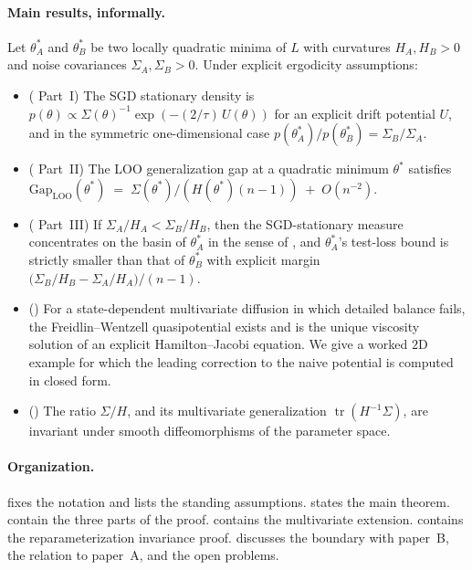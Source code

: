 \documentclass[11pt,a4paper]{article}
\theoremstyle{definition}
\theoremstyle{remark}
\DeclareMathOperator{\tr}{tr}
\newcommand{\Gap}{\mathrm{Gap}}
\newcommand{\LOO}{\mathrm{LOO}}
\begin{document}
\paragraph{Main results, informally.}
Let $\theta_A^*$ and $\theta_B^*$ be two locally quadratic minima of $L$
with curvatures $H_A,H_B>0$ and noise covariances $\Sigma_A,\Sigma_B>0$.
Under explicit ergodicity assumptions:
\begin{itemize}
\item ( Part~I) The SGD stationary density is
   $p(\theta) \propto \Sigma(\theta)^{-1}\exp(-(2/\tau)\,U(\theta))$
   for an explicit drift potential $U$, and in the symmetric one-dimensional
   case $p(\theta_A^*)/p(\theta_B^*) = \Sigma_B/\Sigma_A$.
\item ( Part~II) The LOO generalization gap at a
   quadratic minimum $\theta^*$ satisfies
   $\Gap_{\LOO}(\theta^*) \;=\; \Sigma(\theta^*)/(H(\theta^*)(n-1)) \;+\;
                                                                  O(n^{-2})$.
\item ( Part~III) If $\Sigma_A/H_A < \Sigma_B/H_B$,
   then the SGD-stationary measure concentrates on the basin of $\theta_A^*$
   in the sense of , and $\theta_A^*$'s test-loss
   bound is strictly smaller than that of $\theta_B^*$ with explicit margin
   $\bigl(\Sigma_B/H_B - \Sigma_A/H_A\bigr)/(n-1)$.
\item () For a state-dependent multivariate diffusion in
   which detailed balance fails, the Freidlin--Wentzell quasipotential
   exists and is the unique viscosity solution of an explicit
   Hamilton--Jacobi equation.  We give a worked $2$D example for which
   the leading correction to the naive potential is computed in closed
   form.
\item () The ratio $\Sigma/H$, and its multivariate
   generalization $\tr(H^{-1}\Sigma)$, are invariant under smooth
   diffeomorphisms of the parameter space.
\end{itemize}

\paragraph{Organization.}
 fixes the notation and lists the standing assumptions.
 states the main theorem.
 contain the three parts of the
proof.   contains the multivariate extension.
 contains the reparameterization invariance proof.
 discusses the boundary with paper~B, the relation to
paper~A, and the open problems.
\end{document}
